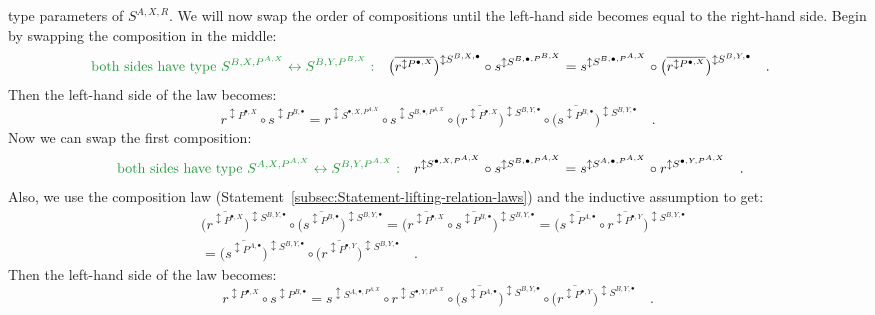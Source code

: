 type parameters of $S^{A,X,R}$. We will now swap the order of compositions
until the left-hand side becomes equal to the right-hand side. Begin
by swapping the composition in the middle:
\begin{align*}
{\color{greenunder}\text{both sides have type }S^{B,X,P^{A,X}}\leftrightarrow S^{B,Y,P^{B,X}}:}\quad & \big(\overline{r^{\updownarrow P^{\bullet,X}}}\big)^{\updownarrow S^{B,X,\bullet}}\circ s^{\updownarrow S^{B,\bullet,P^{B,X}}}=s^{\updownarrow S^{B,\bullet,P^{A,X}}}\circ\big(\overline{r^{\updownarrow P^{\bullet,X}}}\big)^{\updownarrow S^{B,Y,\bullet}}\quad.
\end{align*}
Then the left-hand side of the law becomes:
\[
r^{\updownarrow P^{\bullet,X}}\circ s^{\updownarrow P^{B,\bullet}}=r^{\updownarrow S^{\bullet,X,P^{A,X}}}\circ s^{\updownarrow S^{B,\bullet,P^{A,X}}}\circ\big(\overline{r^{\updownarrow P^{\bullet,X}}}\big)^{\updownarrow S^{B,Y,\bullet}}\circ\big(\overline{s^{\updownarrow P^{B,\bullet}}}\big)^{\updownarrow S^{B,Y,\bullet}}\quad.
\]
Now we can swap the first composition:
\begin{align*}
{\color{greenunder}\text{both sides have type }S^{A,X,P^{A,X}}\leftrightarrow S^{B,Y,P^{A,X}}:}\quad & r^{\updownarrow S^{\bullet,X,P^{A,X}}}\circ s^{\updownarrow S^{B,\bullet,P^{A,X}}}=s^{\updownarrow S^{A,\bullet,P^{A,X}}}\circ r^{\updownarrow S^{\bullet,Y,P^{A,X}}}\quad.
\end{align*}
Also, we use the composition law (Statement~\ref{subsec:Statement-lifting-relation-laws})
and the inductive assumption to get:
\begin{align*}
 & \big(\overline{r^{\updownarrow P^{\bullet,X}}}\big)^{\updownarrow S^{B,Y,\bullet}}\circ\big(\overline{s^{\updownarrow P^{B,\bullet}}}\big)^{\updownarrow S^{B,Y,\bullet}}=\big(\overline{r^{\updownarrow P^{\bullet,X}}}\circ\overline{s^{\updownarrow P^{B,\bullet}}}\big)^{\updownarrow S^{B,Y,\bullet}}=\big(\overline{s^{\updownarrow P^{A,\bullet}}}\circ\overline{r^{\updownarrow P^{\bullet,Y}}}\big)^{\updownarrow S^{B,Y,\bullet}}\\
 & =\big(\overline{s^{\updownarrow P^{A,\bullet}}}\big)^{\updownarrow S^{B,Y,\bullet}}\circ\big(\overline{r^{\updownarrow P^{\bullet,Y}}}\big)^{\updownarrow S^{B,Y,\bullet}}\quad.
\end{align*}
Then the left-hand side of the law becomes:
\[
r^{\updownarrow P^{\bullet,X}}\circ s^{\updownarrow P^{B,\bullet}}=s^{\updownarrow S^{A,\bullet,P^{A,X}}}\circ r^{\updownarrow S^{\bullet,Y,P^{A,X}}}\circ\big(\overline{s^{\updownarrow P^{A,\bullet}}}\big)^{\updownarrow S^{B,Y,\bullet}}\circ\big(\overline{r^{\updownarrow P^{\bullet,Y}}}\big)^{\updownarrow S^{B,Y,\bullet}}\quad.
\]
